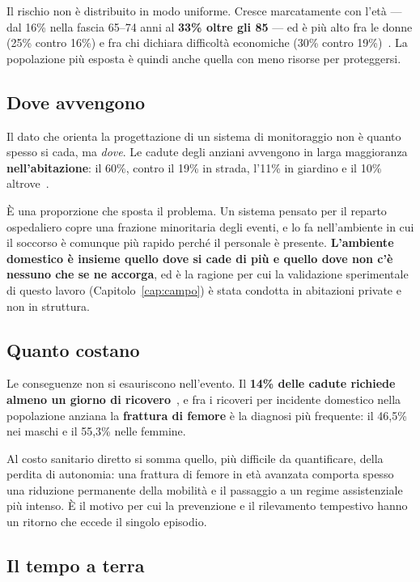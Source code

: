 Il rischio non è distribuito in modo uniforme. Cresce marcatamente con l'età — dal 16\% nella fascia 65--74 anni al \textbf{33\% oltre gli 85} — ed è più alto fra le donne (25\% contro 16\%) e fra chi dichiara difficoltà economiche (30\% contro 19\%)~\cite{passi}. La popolazione più esposta è quindi anche quella con meno risorse per proteggersi.\subsection*{Dove avvengono}

Il dato che orienta la progettazione di un sistema di monitoraggio non è quanto spesso si cada, ma \emph{dove}. Le cadute degli anziani avvengono in larga maggioranza \textbf{nell'abitazione}: il 60\%, contro il 19\% in strada, l'11\% in giardino e il 10\% altrove~\cite{passi}.

È una proporzione che sposta il problema. Un sistema pensato per il reparto ospedaliero copre una frazione minoritaria degli eventi, e lo fa nell'ambiente in cui il soccorso è comunque più rapido perché il personale è presente. \textbf{L'ambiente domestico è insieme quello dove si cade di più e quello dove non c'è nessuno che se ne accorga}, ed è la ragione per cui la validazione sperimentale di questo lavoro (Capitolo~\ref{cap:campo}) è stata condotta in abitazioni private e non in struttura.

\subsection*{Quanto costano}

Le conseguenze non si esauriscono nell'evento. Il \textbf{14\% delle cadute richiede almeno un giorno di ricovero}~\cite{passi}, e fra i ricoveri per incidente domestico nella popolazione anziana la \textbf{frattura di femore} è la diagnosi più frequente: il 46,5\% nei maschi e il 55,3\% nelle femmine.

Al costo sanitario diretto si somma quello, più difficile da quantificare, della perdita di autonomia: una frattura di femore in età avanzata comporta spesso una riduzione permanente della mobilità e il passaggio a un regime assistenziale più intenso. È il motivo per cui la prevenzione e il rilevamento tempestivo hanno un ritorno che eccede il singolo episodio.

\subsection*{Il tempo a terra}

